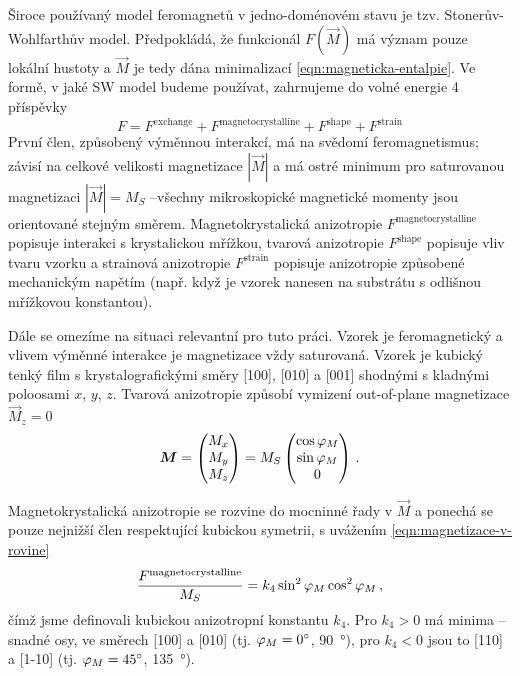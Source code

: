 Široce používaný model feromagnetů v jedno-doménovém stavu je tzv. Stonerův-Wohlfarthův model.
Předpokládá, že funkcionál $F(\vec{M})$ má význam pouze lokální hustoty a $\vec{M}$ je tedy dána minimalizací \eqref{eqn:magneticka-entalpie}.
Ve formě, v jaké SW model budeme používat, zahrnujeme do volné energie 4 příspěvky
\begin{equation}
    F=F^\textrm{exchange} + F^\textrm{magnetocrystalline} + F^\textrm{shape} + F^\textrm{strain}
\end{equation}
První člen, způsobený výměnnou interakcí, má na svědomí feromagnetismus; závisí na celkové velikosti magnetizace $|\vec{M}|$ a má ostré minimum pro saturovanou magnetizaci $|\vec{M}|=M_S$ --\tododash všechny mikroskopické magnetické momenty jsou orientované stejným směrem.
Magnetokrystalická anizotropie $F^\textrm{magnetocrystalline}$ popisuje interakci s krystalickou mřížkou, tvarová anizotropie $F^\textrm{shape}$ popisuje vliv tvaru vzorku a strainová anizotropie $F^\textrm{strain}$ popisuje anizotropie způsobené mechanickým napětím (např. když je vzorek nanesen na substrátu s odlišnou mřížkovou konstantou).

Dále se omezíme na situaci relevantní pro tuto práci.
Vzorek je feromagnetický a vlivem výměnné interakce je magnetizace vždy saturovaná.
Vzorek je kubický tenký film s krystalografickými směry [100], [010] a [001] shodnými s kladnými poloosami $x$, $y$, $z$.
Tvarová anizotropie způsobí vymizení out-of-plane magnetizace $\vec{M}_z=0$
\begin{equation}
\label{eqn:magnetizace-v-rovine}
    \bm{M}=\begin{pmatrix} M_x \\ M_y \\ M_z \end{pmatrix}
    = M_S \begin{pmatrix} \cos \varphi_M \\ \sin \varphi_M \\ 0 \end{pmatrix} \,.
\end{equation}

Magnetokrystalická anizotropie se rozvine do mocninné řady v $\vec{M}$ a ponechá se pouze nejnižší člen respektující kubickou symetrii, s uvážením \eqref{eqn:magnetizace-v-rovine}
\begin{equation}
    \frac{F^\textrm{magnetocrystalline}}{M_S}=k_4 \sin^2 \varphi_M \cos^2 \varphi_M \,,
\end{equation}
čímž jsme definovali kubickou anizotropní konstantu $k_4$.
Pro $k_4>0$ má minima --\tododash snadné osy, ve směrech [100] a [010] (tj. $\varphi_M=\SI{0}{\degree}$, \SI{90}{\degree}), pro $k_4<0$ jsou to [110] a [1-10] (tj. $\varphi_M=\SI{45}{\degree}$, \SI{135}{\degree}).

